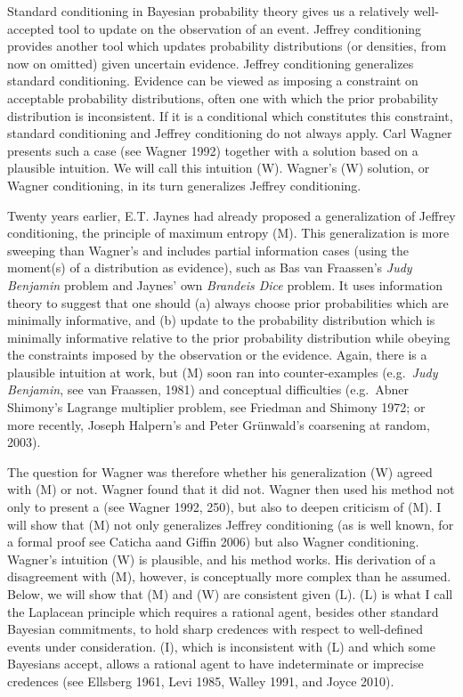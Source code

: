 \documentclass[11pt]{article}
\begin{document}
Standard conditioning in Bayesian probability theory gives us a
relatively well-accepted tool to update on the observation of an
event. Jeffrey conditioning provides another tool which updates
probability distributions (or densities, from now on omitted) given
uncertain evidence. Jeffrey conditioning generalizes standard
conditioning. Evidence can be viewed as imposing a constraint on
acceptable probability distributions, often one with which the prior
probability distribution is inconsistent. If it is a conditional which
constitutes this constraint, standard conditioning and Jeffrey
conditioning do not always apply. Carl Wagner presents such a case
(see Wagner 1992) together with a solution based on a plausible
intuition. We will call this intuition (W). Wagner's (W) solution, or
Wagner conditioning, in its turn generalizes Jeffrey conditioning.

Twenty years earlier, E.T. Jaynes had already proposed a
generalization of Jeffrey conditioning, the principle of maximum
entropy (M). This generalization is more sweeping than Wagner's and
includes partial information cases (using the moment(s) of a
distribution as evidence), such as Bas van Fraassen's \emph{Judy
  Benjamin} problem and Jaynes' own \emph{Brandeis Dice} problem. It
uses information theory to suggest that one should (a) always choose
prior probabilities which are minimally informative, and (b) update to
the probability distribution which is minimally informative relative
to the prior probability distribution while obeying the constraints
imposed by the observation or the evidence. Again, there is a
plausible intuition at work, but (M) soon ran into counter-examples
(e.g.\ \emph{Judy Benjamin}, see van Fraassen, 1981) and conceptual
difficulties (e.g.\ Abner Shimony's Lagrange multiplier problem, see
Friedman and Shimony 1972; or more recently, Joseph Halpern's and
Peter Gr{\"u}nwald's coarsening at random, 2003). 

The question for Wagner was therefore whether his generalization (W)
agreed with (M) or not. Wagner found that it did not. Wagner then used
his method not only to present a  (see Wagner 1992, 250), but also to deepen
criticism of (M). I will show that (M) not only generalizes Jeffrey
conditioning (as is well known, for a formal proof see Caticha aand
Giffin 2006) but also Wagner conditioning. Wagner's intuition (W) is
plausible, and his method works. His derivation of a disagreement with
(M), however, is conceptually more complex than he assumed. Below, we
will show that (M) and (W) are consistent given (L). (L) is what I
call the Laplacean principle which requires a rational agent, besides
other standard Bayesian commitments, to hold sharp credences with
respect to well-defined events under consideration. (I), which is
inconsistent with (L) and which some Bayesians accept, allows a
rational agent to have indeterminate or imprecise credences (see
Ellsberg 1961, Levi 1985, Walley 1991, and Joyce 2010).
\end{document}
